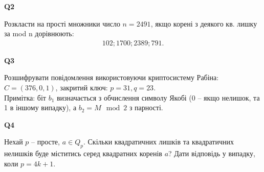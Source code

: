 \documentclass{../../test-template}
\begin{document}
\begin{tcolorbox}[lowerbox=invisible,colback=white]
    \begin{minipage}{0.1\textwidth}
        \raggedright
        \vspace*{\fill}
            \textbf{Q2}
        \vspace*{\fill}
        \end{minipage}
        \begin{minipage}{0.75\textwidth}
       Розкласти на прості множники число $n = 2491$, якщо корені з деякого кв. лишку за mod n дорівнюють:
       \begin{align*}
           102; 1700; 2389; 791.
       \end{align*}
        \end{minipage}
\end{tcolorbox}

\begin{tcolorbox}[lowerbox=invisible,colback=white]
    \begin{minipage}{0.1\textwidth}
        \raggedright
        \vspace*{\fill}
            \textbf{Q3}
        \vspace*{\fill}
        \end{minipage}
        \begin{minipage}{0.75\textwidth}
       Розшифрувати повідомлення використовуючи криптосистему Рабіна: $C=(376, 0, 1)$, закритий ключ: $p=31, q=23$.
       \\
       Примітка: біт $b_1$ визначається з обчислення символу Якобі (0 -- якщо нелишок, та 1 в іншому випадку), а $b_2=M\mod 2$ з парності.
        \end{minipage}
\end{tcolorbox}
\begin{tcolorbox}[lowerbox=invisible,colback=white]
    \begin{minipage}{0.1\textwidth}
        \raggedright
        \vspace*{\fill}
            \textbf{Q4}
        \vspace*{\fill}
        \end{minipage}
        \begin{minipage}{0.75\textwidth}
        Нехай $p$ -- просте, $a\in Q_p$. Скільки квадратичних лишків та квадратичних нелишків буде міститись серед квадратних коренів $a$? Дати відповідь у випадку, коли $p=4k+1$.
        \end{minipage}
\end{tcolorbox}
\end{document}
